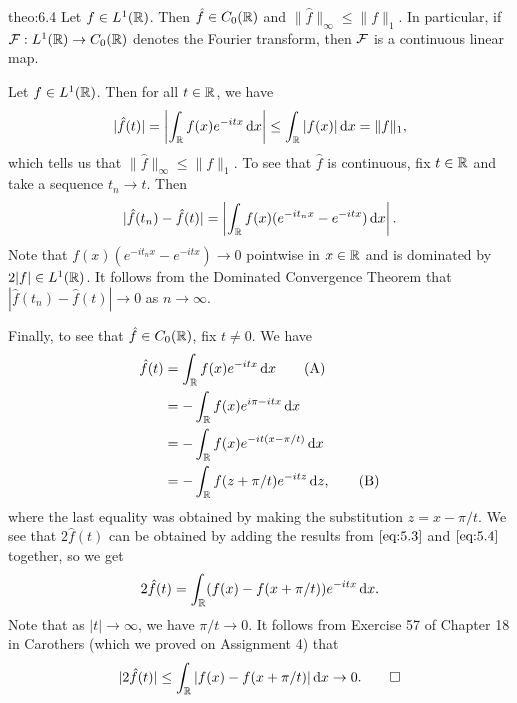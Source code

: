 \begin{theo}{theo:6.4}
    Let $f \in L^1(\mathbb{R})$. Then $\hat f \in C_0(\mathbb{R})$ and $\|\hat f\|_\infty 
    \leq \|f\|_1$. In particular, if ${\cal F} : L^1(\mathbb{R}) \to C_0(\mathbb{R})$ 
    denotes the Fourier transform, then ${\cal F}$ is a continuous linear map. 
\end{theo}
\begin{pf}
    Let $f \in L^1(\mathbb{R})$. Then for all $t \in \mathbb{R}$, we have 
    \[ |\hat f(t)| = \left| \int_{\mathbb{R}} f(x) e^{-itx}\,\mathrm{d} x \right| \leq 
    \int_{\mathbb{R}} |f(x)|\,\mathrm{d} x = \|f\|_1, \] 
    which tells us that $\|\hat f\|_\infty \leq \|f\|_1$. To see that 
    $\hat f$ is continuous, fix $t \in \mathbb{R}$ and take a sequence $t_n \to t$. 
    Then
    \[ |\hat f(t_n) - \hat f(t)| = \left| \int_{\mathbb{R}} f(x) (e^{-it_nx} - e^{-itx})\,\mathrm{d} x \right|. \] 
    Note that $f(x)(e^{-it_nx} - e^{-itx}) \to 0$ pointwise in $x \in \mathbb{R}$ 
    and is dominated by $2|f| \in L^1(\mathbb{R})$. It follows from the Dominated 
    Convergence Theorem that $|\hat f(t_n) - \hat f(t)| \to 0$ as $n \to \infty$. 

    Finally, to see that $\hat f \in C_0(\mathbb{R})$, fix $t \neq 0$. We have 
    \begin{align*}
        \hat f(t) &= \int_{\mathbb{R}} f(x) e^{-itx}\,\mathrm{d} x \tag{A} \label{eq:5.3} \\ 
        &= -\int_{\mathbb{R}} f(x) e^{i\pi-itx}\,\mathrm{d} x \\ 
        &= -\int_{\mathbb{R}} f(x) e^{-it(x-\pi/t)}\,\mathrm{d} x \\ 
        &= -\int_{\mathbb{R}} f(z + \pi/t) e^{-itz}\,\mathrm{d} z, \tag{B} \label{eq:5.4}
    \end{align*}
    where the last equality was obtained by making the substitution $z = 
    x - \pi/t$. We see that $2\hat f(t)$ can be obtained by 
    adding the results from $\eqref{eq:5.3}$ and $\eqref{eq:5.4}$ together, 
    so we get 
    \[ 2\hat f(t) = \int_{\mathbb{R}} (f(x) - f(x + \pi/t)) e^{-itx}\,\mathrm{d} x. \] 
    Note that as $|t| \to \infty$, we have $\pi/t \to 0$. It follows from 
    Exercise 57 of Chapter 18 in Carothers (which we proved on Assignment 4)
    that 
    \[ |2\hat f(t)| \leq \int_{\mathbb{R}} |f(x) - f(x + \pi/t)|\,\mathrm{d} x \to 0. \qedhere \] 
\end{pf}
